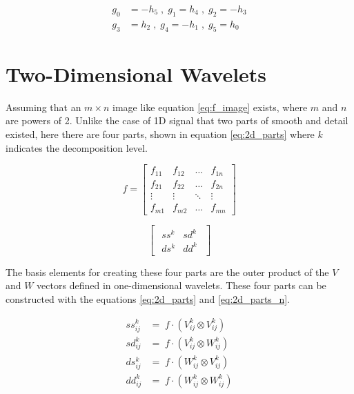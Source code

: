 \documentclass[12pt]{article}
\begin{document}
	\begin{equation}
		\begin{aligned}
			g_0 &= -h_5 \;,\; g_1 = h_4 \;,\; g_2 = -h_3 \\
			g_3 &= h_2 \;,\; g_4 = -h_1 \;,\; g_5 = h_0
		\end{aligned}
		\label{eq:g_sym3}
	\end{equation}
	
	\section{Two-Dimensional Wavelets}
	
	Assuming that an $m\times n$ image like equation \ref{eq:f_image} exists, where $m$ and $n$ are powers of 2. Unlike the case of 1D signal that two parts of smooth and detail existed, here there are four parts, shown in equation \ref{eq:2d_parts} where $k$ indicates the decomposition level.
	
	\begin{equation}
		f = 
		\begin{bmatrix}
			f_{11} & f_{12} & \dots & f_{1n} \\
			f_{21} & f_{22} & \dots & f_{2n} \\
			\vdots & \vdots & \ddots & \vdots \\
			f_{m1} & f_{m2} & \dots & f_{mn} 
		\end{bmatrix}
		\label{eq:f_image}
	\end{equation}
		
	\begin{equation}
		\begin{bmatrix}
		\begin{array}{c|c}
			ss^k & sd^k \\
			\hline
			ds^k & dd^k
		\end{array}
		\end{bmatrix}
	\end{equation}
	
	The basis elements for creating these four parts are the outer product of the $V$ and $W$ vectors defined in one-dimensional wavelets. These four parts can be constructed with the equations \ref{eq:2d_parts} and \ref{eq:2d_parts_n}.
	
	\begin{equation}
		\begin{aligned}
		ss_{ij}^k &= \; f \cdot (V_{ij}^k \otimes V_{ij}^k) \\
		sd_{ij}^k &= \; f \cdot (V_{ij}^k \otimes W_{ij}^k) \\
		ds_{ij}^k &= \; f \cdot (W_{ij}^k \otimes V_{ij}^k) \\
		dd_{ij}^k &= \; f \cdot (W_{ij}^k \otimes W_{ij}^k)
		\end{aligned}
		\label{eq:2d_parts}
	\end{equation}
\end{document}
